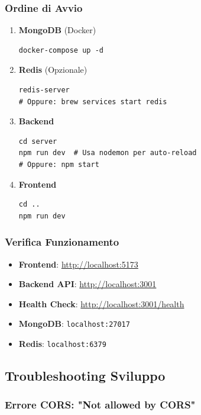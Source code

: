 \documentclass[11pt,a4paper]{article}
\newcommand{\code}[1]{\texttt{#1}}
\begin{document}
\subsubsection{Ordine di Avvio}

\begin{enumerate}
    \item \textbf{MongoDB} (Docker)
    \begin{lstlisting}
docker-compose up -d
    \end{lstlisting}
    
    \item \textbf{Redis} (Opzionale)
    \begin{lstlisting}
redis-server
# Oppure: brew services start redis
    \end{lstlisting}
    
    \item \textbf{Backend}
    \begin{lstlisting}
cd server
npm run dev  # Usa nodemon per auto-reload
# Oppure: npm start
    \end{lstlisting}
    
    \item \textbf{Frontend}
    \begin{lstlisting}
cd ..
npm run dev
    \end{lstlisting}
\end{enumerate}

\subsubsection{Verifica Funzionamento}

\begin{itemize}
    \item \textbf{Frontend}: \url{http://localhost:5173}
    \item \textbf{Backend API}: \url{http://localhost:3001}
    \item \textbf{Health Check}: \url{http://localhost:3001/health}
    \item \textbf{MongoDB}: \code{localhost:27017}
    \item \textbf{Redis}: \code{localhost:6379}
\end{itemize}

\subsection{Troubleshooting Sviluppo}

\subsubsection{Errore CORS: "Not allowed by CORS"}
\end{document}
